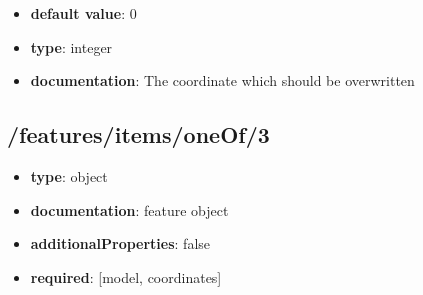 \begin{itemize}\item {\bf default value}: 0
\item {\bf type}: integer
\item {\bf documentation}: The coordinate which should be overwritten
\end{itemize}\subsection{/features/items/oneOf/3}
\begin{itemize}\item {\bf type}: object
\item {\bf documentation}: feature object
\item {\bf additionalProperties}: false
\item {\bf required}: [model, coordinates]\end{itemize}
